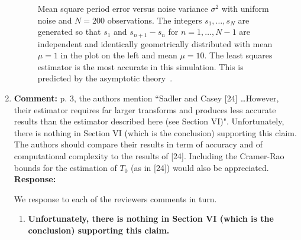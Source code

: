 \documentclass[a4paper,10pt]{article}
\begin{document}
\begin{enumerate}
\begin{figure}[p]
  \caption{Mean square period error versus noise variance $\sigma^2$ with uniform noise and $N=200$ observations.  The integers $s_1,\dots,s_N$ are generated so that $s_1$ and $s_{n+1} - s_n$ for $n=1,\dots,N-1$ are independent and identically geometrically distributed with mean $\mu = 1$ in the plot on the left and mean $\mu=10$.  The least squares estimator is the most accurate in this simulation. This is predicted by the asymptotic theory~\cite{Quinn_sparse_noisy_SSP_2012,Quinn20013asilomar_period_est}.}\label{plot:geomuniform}
\end{figure}


\item\textbf{Comment:}
p. 3, the authors mention “Sadler and Casey [24] \dots However, their estimator
requires far larger transforms and produces less accurate results than the estimator
described here (see Section VI)". Unfortunately, there is nothing in
Section VI (which is the conclusion) supporting this claim. The authors should
compare their results in term of accuracy and of computational complexity to
the results of [24]. Including the Cramer-Rao bounds for the estimation of $T_0$
(as in [24]) would also be appreciated.
\\
\textbf{Response:}

We response to each of the reviewers comments in turn.

\begin{enumerate}

\item \textbf{Unfortunately, there is nothing in
Section VI (which is the conclusion) supporting this claim.}


\end{enumerate}
\end{enumerate}
\end{document}
